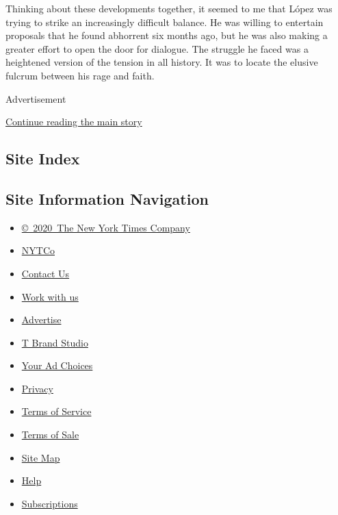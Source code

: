 Thinking about these developments together, it seemed to me that López
was trying to strike an increasingly difficult balance. He was willing
to entertain proposals that he found abhorrent six months ago, but he
was also making a greater effort to open the door for dialogue. The
struggle he faced was a heightened version of the tension in all
history. It was to locate the elusive fulcrum between his rage and
faith.

Advertisement

\protect\hyperlink{after-bottom}{Continue reading the main story}

\hypertarget{site-index}{%
\subsection{Site Index}\label{site-index}}

\hypertarget{site-information-navigation}{%
\subsection{Site Information
Navigation}\label{site-information-navigation}}

\begin{itemize}
\tightlist
\item
  \href{https://help.nytimes3xbfgragh.onion/hc/en-us/articles/115014792127-Copyright-notice}{©~2020~The
  New York Times Company}
\end{itemize}

\begin{itemize}
\tightlist
\item
  \href{https://www.nytco.com/}{NYTCo}
\item
  \href{https://help.nytimes3xbfgragh.onion/hc/en-us/articles/115015385887-Contact-Us}{Contact
  Us}
\item
  \href{https://www.nytco.com/careers/}{Work with us}
\item
  \href{https://nytmediakit.com/}{Advertise}
\item
  \href{http://www.tbrandstudio.com/}{T Brand Studio}
\item
  \href{https://www.nytimes3xbfgragh.onion/privacy/cookie-policy\#how-do-i-manage-trackers}{Your
  Ad Choices}
\item
  \href{https://www.nytimes3xbfgragh.onion/privacy}{Privacy}
\item
  \href{https://help.nytimes3xbfgragh.onion/hc/en-us/articles/115014893428-Terms-of-service}{Terms
  of Service}
\item
  \href{https://help.nytimes3xbfgragh.onion/hc/en-us/articles/115014893968-Terms-of-sale}{Terms
  of Sale}
\item
  \href{https://spiderbites.nytimes3xbfgragh.onion}{Site Map}
\item
  \href{https://help.nytimes3xbfgragh.onion/hc/en-us}{Help}
\item
  \href{https://www.nytimes3xbfgragh.onion/subscription?campaignId=37WXW}{Subscriptions}
\end{itemize}
